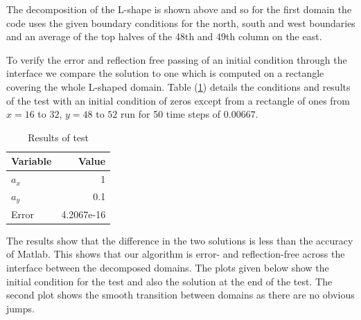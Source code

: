 \documentclass[11pt,a4paper,notitlepage]{article}
\begin{document}
The decomposition of the L-shape is shown above and so for the first domain the code uses the given boundary conditions for the north, south and west boundaries and an average of the top halves of the 48th and 49th column on the east.

To verify the error and reflection free passing of an initial condition through the interface we compare the solution to one which is computed on a rectangle covering the whole L-shaped domain. Table (\ref{tab1}) details the conditions and results of the test with an initial condition of zeros except from a rectangle of ones from $x = 16$ to $32$, $y = 48$ to $52$ run for 50 time steps of $0.00667$.

\newpage

\begin{table}[h]

  \begin{center}
    \begin{tabular}{|l r|}
	\hline
	Variable & Value \\    
    \hline
    $a_x$ & 1 \\
    $a_y$ & 0.1\\
    Error & 4.2067e-16\\
    \hline
    \end{tabular}
  \end{center}
  \vspace{-10pt}
  \caption{Results of test}
 \label{tab1}
\end{table}

The results show that the difference in the two solutions is less than the accuracy of Matlab. This shows that our algorithm is error- and reflection-free across the interface between the decomposed domains. The plots given below show the initial condition for the test and also the solution at the end of the test. The second plot shows the smooth transition between domains as there are no obvious jumps.
\end{document}
